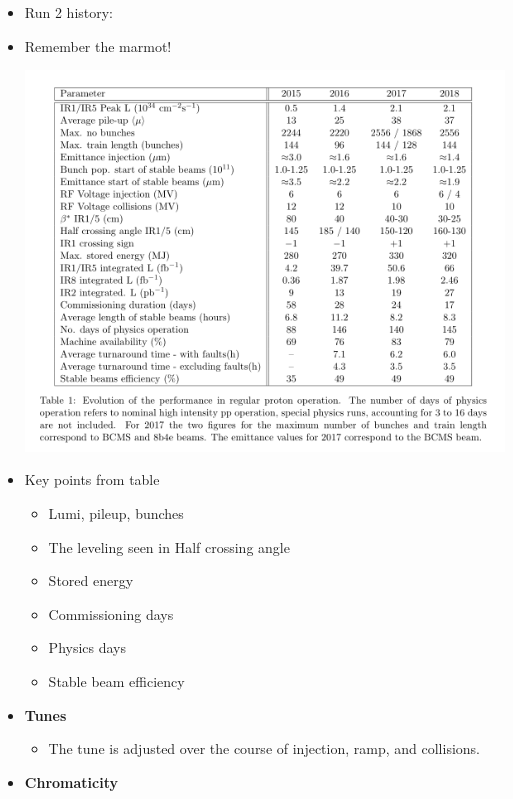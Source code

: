 \begin{itemize}
\begin{itemize}
    \end{itemize}
    \item Run 2 history: \cite{lhcRun2}
    \item Remember the marmot! \cite{lhcRun2}
    \begin{center}
    \includegraphics[width=1\textwidth]{figures/notes-experiment/run2History.png}
    \end{center}
    \item Key points from table \cite{lhcRun2}
    \begin{itemize}
        \item Lumi, pileup, bunches \cite{lhcRun2}
        \item The leveling seen in Half crossing angle \cite{lhcRun2}
        \item Stored energy \cite{lhcRun2}
        \item Commissioning days \cite{lhcRun2}
        \item Physics days \cite{lhcRun2}
        \item Stable beam efficiency \cite{lhcRun2}
    \end{itemize}
    \item \textbf{Tunes} \cite{lhcRun2}
    \begin{itemize}
        \item The tune is adjusted over the course of injection, ramp, and collisions. \cite{lhcRun2}
    \end{itemize}
    \item \textbf{Chromaticity} \cite{lhcRun2}
    \begin{itemize}

\end{itemize}
\end{itemize}
